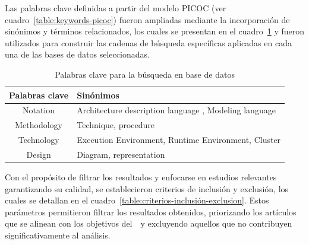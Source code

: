 Las palabras clave definidas a partir del modelo PICOC (ver cuadro~\ref{table:keywords-picoc}) fueron ampliadas mediante la incorporación de sinónimos y términos relacionados, los cuales se presentan en el cuadro~\ref{tab:keywords} y fueron utilizados para construir las cadenas de búsqueda específicas aplicadas en cada una de las bases de datos seleccionadas.

\begin{table}[H]
	\centering
	\scriptsize
	\setlength{\tabcolsep}{4pt}
	\fontsize{9pt}{10pt}\selectfont %
	\begin{tabular}{|c|p{12.5cm}|} %
		\hline
		\textbf{Palabras clave} & \textbf{Sinónimos}                                                             \\
		\hline
		Notation                & Architecture description language ,  Modeling language                \\
		\hline
		Methodology                     & Technique, procedure                     \\
		\hline
		Technology                & Execution Environment, Runtime Environment, Cluster                            \\
		\hline
		Design                 & Diagram, representation \\
		\hline
	\end{tabular}
	\caption{Palabras clave para la búsqueda en base de datos}
	\label{tab:keywords}
\end{table}



\noindent
Con el propósito de filtrar los resultados y enfocarse en estudios relevantes garantizando su calidad, se establecieron criterios de inclusión y exclusión, los cuales se detallan en el cuadro~\ref{table:criterios-inclusión-exclusion}. Estos parámetros permitieron filtrar los resultados obtenidos, priorizando los artículos que se alinean con los objetivos del~\SMS~y excluyendo aquellos que no contribuyen significativamente al análisis.

